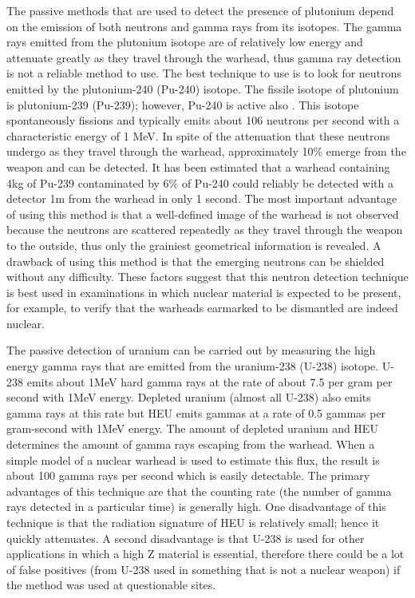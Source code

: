\documentclass[twoside,titlepage,11pt,twocolumn,a4paper]{article}
\begin{document}
The passive methods that are used to detect the presence of plutonium
depend on the emission of both neutrons and gamma rays from its
isotopes. The gamma rays emitted from the plutonium isotope are of
relatively low energy and attenuate greatly as they travel through the
warhead, thus gamma ray detection is not a reliable method to use. The
best technique to use is to look for neutrons emitted by the
plutonium-240 (Pu-240) isotope. The fissile isotope of plutonium is
plutonium-239 (Pu-239); however, Pu-240 is active also
\citep{drell1993}. This isotope spontaneously fissions and typically
emits about 106 neutrons per second with a characteristic energy of 1
MeV. \citep{drell1993} In spite of the attenuation that these neutrons
undergo as they travel through the warhead, approximately 10\% emerge
from the weapon and can be detected. It has been estimated that a
warhead containing 4kg of Pu-239 contaminated by 6\% of Pu-240 could
reliably be detected with a detector 1m from the warhead in only 1
second. \citep{drell1993} The most important advantage of using this
method is that a well-defined image of the warhead is not observed
because the neutrons are scattered repeatedly as they travel through
the weapon to the outside, thus only the grainiest geometrical
information is revealed. \citep{drell1993,drell1990} A drawback of
using this method is that the emerging neutrons can be shielded
without any difficulty. These factors suggest that this neutron
detection technique is best used in examinations in which nuclear
material is expected to be present, for example, to verify that the
warheads earmarked to be dismantled are indeed nuclear.

The passive detection of uranium can be carried out by measuring the
high energy gamma rays that are emitted from the uranium-238 (U-238)
isotope. U-238 emits about 1MeV hard gamma rays at the rate of about
7.5 per gram per second with 1MeV energy. \citep{drell1993} Depleted
uranium (almost all U-238) also emits gamma rays at this rate but HEU
emits gammas at a rate of 0.5 gammas per gram-second with 1MeV
energy. The amount of depleted uranium and HEU determines the amount
of gamma rays escaping from the warhead. When a simple model of a
nuclear warhead is used to estimate this flux, the result is about 100
gamma rays per second which is easily detectable.
\citep{drell1993} The primary advantages of this technique are that
the counting rate (the number of gamma rays detected in a particular
time) is generally high. One disadvantage of this technique is that
the radiation signature of HEU is relatively small; hence it quickly
attenuates. \citep{nuclearMatDet} A second disadvantage is that U-238
is used for other applications in which a high Z material is
essential, therefore there could be a lot of false positives (from
U-238 used in something that is not a nuclear weapon) if the method
was used at questionable sites.
\end{document}
